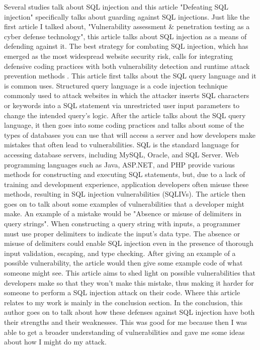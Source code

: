 Several studies talk about SQL injection and this article "Defeating SQL injection" specifically talks about guarding against SQL injections. Just like the first article I talked about, "Vulnerability assessment \& penetration testing as a cyber defense technology", this article talks about SQL injection as a means of defending against it. The best strategy for combating SQL injection, which has emerged as the most widespread website security risk, calls for integrating defensive coding practices with both vulnerability detection and runtime attack prevention methods \cite{shar2012defeating}.
This article first talks about the SQL query language and it is common uses. Structured query language is a code injection technique commonly used to attack websites in which the attacker inserts SQL characters or keywords into a SQL statement via unrestricted user input parameters to change the intended query's logic. After the article talks about the SQL query language, it then goes into some coding practices and talks about some of the types of databases you can use that will access a server and how developers make mistakes that often lead to vulnerabilities. SQL is the standard language for accessing database servers, including MySQL, Oracle, and SQL Server. Web programming languages such as Java, ASP.NET, and PHP provide various methods for constructing and executing SQL statements, but, due to a lack of training and development experience, application developers often misuse these methods, resulting in SQL injection vulnerabilities (SQLIVs). The article then goes on to talk about some examples of vulnerabilities that a developer might make. An example of a mistake would be "Absence or misuse of delimiters in query strings". When constructing a query string with inputs, a programmer must use proper delimiters to indicate the input’s data type. The absence or misuse of delimiters could enable SQL injection even in the presence of thorough input validation, escaping, and type checking. After giving an example of a possible vulnerability, the article would then give some example code of what someone might see. This article aims to shed light on possible vulnerabilities that developers make so that they won't make this mistake, thus making it harder for someone to perform a SQL injection attack on their code. Where this article relates to my work is mainly in the conclusion section. In the conclusion, this author goes on to talk about how these defenses against SQL injection have both their strengths and their weaknesses. This was good for me because then I was able to get a broader understanding of vulnerabilities and gave me some ideas about how I might do my attack.

